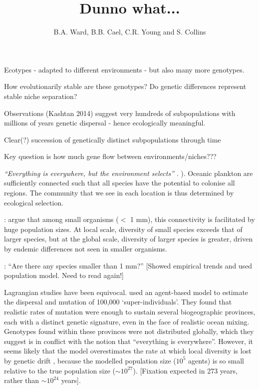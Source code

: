 \documentclass[12pt]{article}
\title{Dunno what...}
\author{B.A. Ward, B.B. Cael, C.R. Young and S. Collins}
\author{}
\date{} %
\begin{document}
 

\maketitle


Ecotypes - adapted to different environments - but also many more genotypes.

How evolutionarily stable are these genotypes? Do genetic differences represent stable niche separation?

Observations (Kashtan 2014) suggest very hundreds of subpopulations with millions of years genetic dispersal - hence ecologically meaningful.

Clear(?) succession of genetically distinct subpopulations through time

Key question is how much gene flow between environments/niches???




\textit{``Everything is everywhere, but the environment selects''} \citep{BaasBecking:1934}. \citep[Also Beijerinck: one particular species of bacteria found anywhere on Earth, provided environmental requirements are met...][]{Fenchel:2004} ). Oceanic plankton are sufficiently connected such that all species have the potential to colonise all regions. The community that we see in each location is thus determined by ecological selection. 

\citet{Fenchel:2004}: argue that among small organisms ($<$ 1 mm), this connectivity is facilitated by huge population sizes. At local scale, diversity of small species exceeds that of larger species, but at the global scale, diversity of larger species is greater, driven by endemic differences not seen in smaller organisms. 



\citet{Rossberg:2013}: ``Are there any species smaller than 1 mm?'' [Showed empirical trends and used population model. Need to read again!]


Lagrangian studies have been equivocal. \citet{Hellweger:2014} used an agent-based model to estimate the dispersal and mutation of 100,000 `super-individuals'. They found that realistic rates of mutation were enough to sustain several biogeographic provinces, each with a distinct genetic signature, even in the face of realistic ocean mixing. Genotypes found within these provinces were not distributed globally, which they suggest is in conflict with the notion that “everything is everywhere”. However, it seems likely that the model overestimates the rate at which local diversity is lost by genetic drift \citep[i.e. coalescence??][]{Kingman:1982}, because the modelled population size ($10^{5}$ agents) is so small relative to the true population size ($\sim10^{27}$). [Fixation expected in 273 years, rather than $\sim10^{24}$ years].
\end{document}
